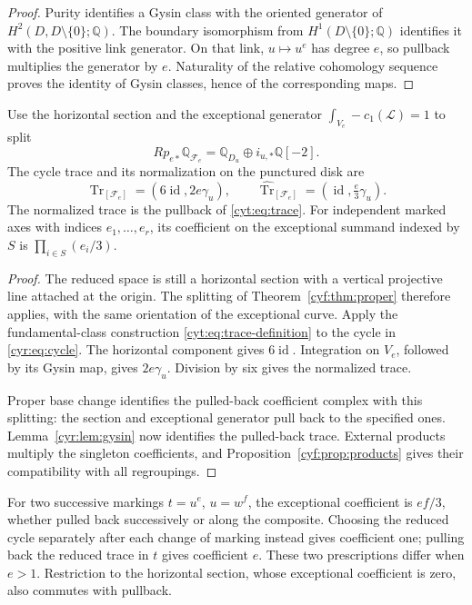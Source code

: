 \begin{proof}
Purity identifies a Gysin class with the oriented generator
of \(H^2(D,D\setminus\{0\};\mathbb Q)\).
The boundary isomorphism from
\(H^1(D\setminus\{0\};\mathbb Q)\) identifies it with the
positive link generator. On that link, \(u\mapsto u^e\)
has degree \(e\), so pullback multiplies the generator by
\(e\). Naturality of the relative cohomology sequence proves
the identity of Gysin classes, hence of the corresponding maps.
\end{proof}

\begin{proposition}\label{cyr:prop:trace}
Use the horizontal section and the exceptional generator
\(\int_{V_e}-c_1(\mathscr L)=1\) to split
\[
 Rp_{e*}\mathbb Q_{\mathscr F_e}
       =\mathbb Q_{D_u}\oplus i_{u,*}\mathbb Q[-2].
\]
The cycle trace and its normalization on the punctured disk are
\begin{equation}\label{cyr:eq:trace}
 \operatorname{Tr}_{[\mathscr F_e]}
       =(6\operatorname{id},2e\gamma_u),\qquad
 \widehat{\operatorname{Tr}}_{[\mathscr F_e]}
       =(\operatorname{id},\tfrac e3\gamma_u).
\end{equation}
The normalized trace is the pullback of
\eqref{cyt:eq:trace}. For independent marked axes with indices
\(e_1,\ldots,e_r\), its coefficient on the exceptional summand
indexed by \(S\) is \(\prod_{i\in S}(e_i/3)\).
\end{proposition}

\begin{proof}
The reduced space is still a horizontal section with a
vertical projective line attached at the origin.
The splitting of Theorem~\ref{cyf:thm:proper} therefore
applies, with the same orientation of the exceptional curve.
Apply the fundamental-class construction
\eqref{cyt:eq:trace-definition} to the cycle in
\eqref{cyr:eq:cycle}. The horizontal component gives
\(6\operatorname{id}\). Integration on \(V_e\), followed by
its Gysin map, gives \(2e\gamma_u\).
Division by six gives the normalized trace.

Proper base change identifies the pulled-back coefficient
complex with this splitting: the section and exceptional
generator pull back to the specified ones.
Lemma~\ref{cyr:lem:gysin} now identifies the pulled-back trace.
External products multiply the singleton coefficients,
and Proposition~\ref{cyf:prop:products} gives their
compatibility with all regroupings.
\end{proof}

For two successive markings \(t=u^e\), \(u=w^f\),
the exceptional coefficient is \(ef/3\), whether pulled
back successively or along the composite. Choosing the reduced cycle separately after
each change of marking instead gives coefficient one;
pulling back the reduced trace in \(t\) gives coefficient
\(e\). These two prescriptions differ when \(e>1\).
Restriction to the horizontal section, whose exceptional
coefficient is zero, also commutes with pullback.

